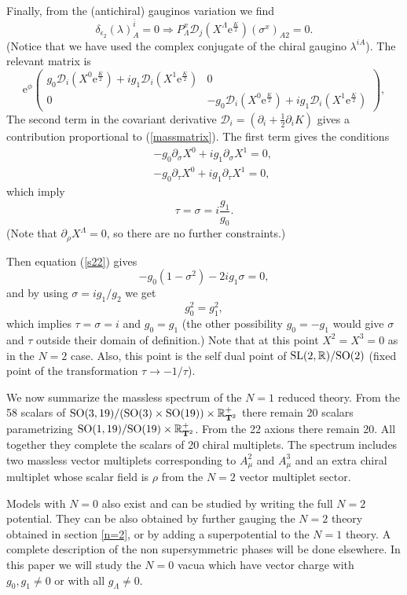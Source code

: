 \documentclass[a4paper,12pt]{article}
\begin{document}
Finally, from the (antichiral) gauginos variation we find
$$\delta_{\epsilon_2}(\lambda)^{\bar i}_A=0\Longrightarrow
P_\Lambda^x\mathcal{D}_j(X^\Lambda\mathrm{e}^{\frac K
2})(\sigma^x)_{A2}=0.$$ (Notice that we have used the complex
conjugate of the chiral gaugino $\lambda^{iA}$). The relevant
matrix is
$$\mathrm{e}^{\phi}\begin{pmatrix}g_0\mathcal{D}_i(X^0\mathrm{e}^{\frac K
2})+ig_1\mathcal{D}_i(X^1\mathrm{e}^{\frac K
2})&0\\
0&-g_0\mathcal{D}_i(X^0\mathrm{e}^{\frac K
2})+ig_1\mathcal{D}_i(X^1\mathrm{e}^{\frac K 2})\end{pmatrix},$$
The second term in the covariant derivative
$\mathcal{D}_i=(\partial_i +\frac 1 2
\partial_i K)$ gives a contribution proportional to
(\ref{massmatrix}). The first term gives the conditions
\begin{eqnarray*}
&&-g_0\partial_\sigma X^0+ig_1\partial_\sigma X^1=0,\\
&&-g_0\partial_\tau X^0+ig_1\partial_\tau X^1=0,\end{eqnarray*}
which imply
$$\tau=\sigma=i\frac {g_1}{g_0}.$$
(Note that $\partial_\rho X^\Lambda=0$, so there are no further
constraints.)

Then equation (\ref{s22}) gives
$$-g_0(1-\sigma^2)-2ig_1\sigma=0,$$
and by using $\sigma=ig_1/g_2$ we get
$$g_0^2=g_1^2,$$
which implies $\tau=\sigma=i$ and $g_0=g_1$ (the other possibility
$g_0=-g_1$ would give $\sigma$ and $\tau$ outside their domain of
definition.) Note that at this point $X^2=X^3=0$ as in the $N=2$
case. Also, this point is the self dual point of
$\mathrm{SL}(2,\mathbb{R})/\mathrm{SO}(2)$ (fixed point of the transformation
$\tau\rightarrow -1/\tau$).

\bigskip

We now summarize the massless spectrum of the $N=1$ reduced
theory. From the 58 scalars of $\mathrm{SO}(3,19)/(\mathrm{SO}(3)\times
\mathrm{SO}(19))\times\mathbb{R}^+_{\mathbf{T}^2}$ there remain 20 scalars parametrizing
$\mathrm{SO}(1,19)/ \mathrm{SO}(19)\times\mathbb{R}^+_{\mathbf{T}^2}$. From the 22 axions there
remain 20. All together they complete the scalars of 20 chiral
multiplets. The spectrum includes two massless vector multiplets
corresponding to $A^2_\mu$ and $A_\mu^3$ and an extra chiral
multiplet whose scalar field is $\rho$ from the $N=2$ vector
multiplet sector.

Models with $N=0$ also exist and can be studied by writing the
full $N=2$ potential. They can be also obtained by further gauging
the $N=2$ theory obtained  in section \ref{n=2},  or by adding a
superpotential to the $N=1$ theory. A complete description of the
non supersymmetric phases will be done elsewhere. In this paper we
will study the $N=0$ vacua which have vector charge with $g_{0},
g_1\neq 0$ or with all $g_\Lambda\neq 0$.
\end{document}
